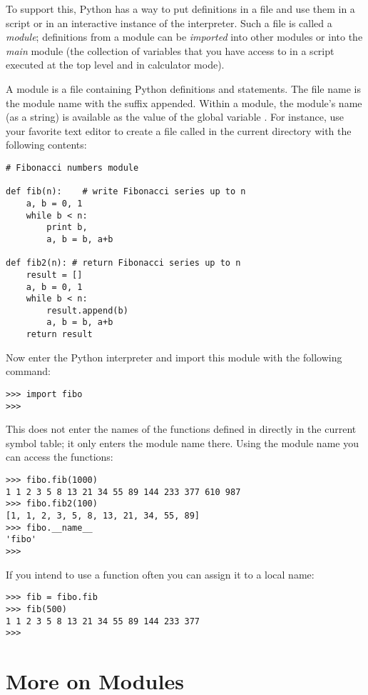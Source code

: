 To support this, Python has a way to put definitions in a file and use
them in a script or in an interactive instance of the interpreter.
Such a file is called a \emph{module}; definitions from a module can be
\emph{imported} into other modules or into the \emph{main} module (the
collection of variables that you have access to in a script
executed at the top level
and in calculator mode).

A module is a file containing Python definitions and statements.  The
file name is the module name with the suffix  appended.  Within
a module, the module's name (as a string) is available as the value of
the global variable .  For instance, use your favorite text
editor to create a file called  in the current directory
with the following contents:

\bcode\begin{verbatim}
# Fibonacci numbers module

def fib(n):    # write Fibonacci series up to n
    a, b = 0, 1
    while b < n:
        print b,
        a, b = b, a+b

def fib2(n): # return Fibonacci series up to n
    result = []
    a, b = 0, 1
    while b < n:
        result.append(b)
        a, b = b, a+b
    return result
\end{verbatim}\ecode
%
Now enter the Python interpreter and import this module with the
following command:

\bcode\begin{verbatim}
>>> import fibo
>>> 
\end{verbatim}\ecode
%
This does not enter the names of the functions defined in
directly in the current symbol table; it only enters the module name
there.
Using the module name you can access the functions:

\bcode\begin{verbatim}
>>> fibo.fib(1000)
1 1 2 3 5 8 13 21 34 55 89 144 233 377 610 987
>>> fibo.fib2(100)
[1, 1, 2, 3, 5, 8, 13, 21, 34, 55, 89]
>>> fibo.__name__
'fibo'
>>> 
\end{verbatim}\ecode
%
If you intend to use a function often you can assign it to a local name:

\bcode\begin{verbatim}
>>> fib = fibo.fib
>>> fib(500)
1 1 2 3 5 8 13 21 34 55 89 144 233 377
>>> 
\end{verbatim}\ecode


\section{More on Modules}

